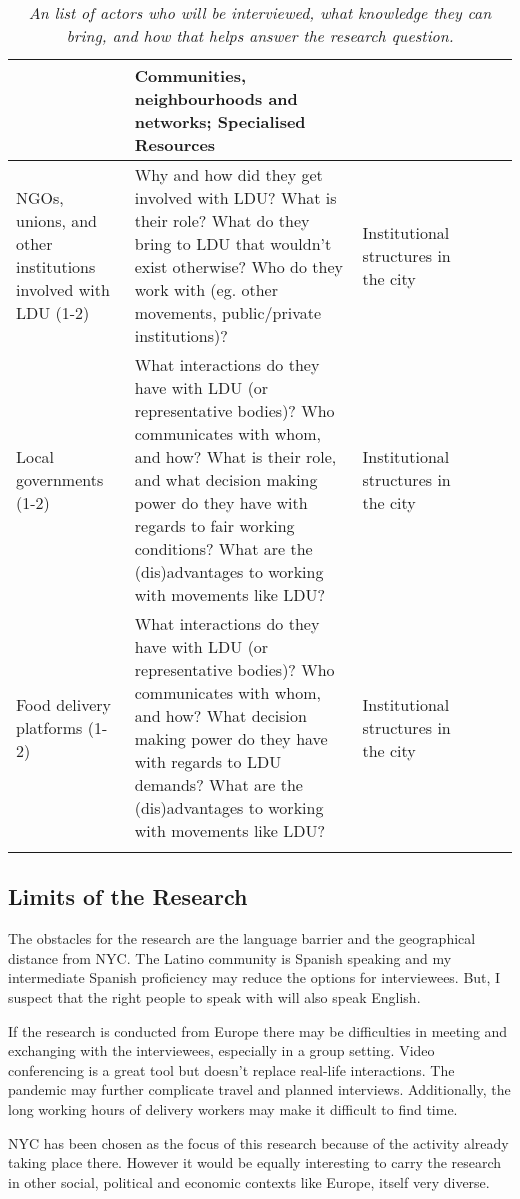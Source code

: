 \documentclass{article}[12pt]
\begin{document}
\begin{longtable}{ Lp{.35\textwidth} Lp{.60\textwidth} Lp{.4\textwidth}}
	 &
	Communities, neighbourhoods and networks; Specialised Resources  \\ 
	\hline
	NGOs, unions, and other institutions involved with LDU (1-2) &
	Why and how did they get involved with LDU? What is their role? What do they bring to LDU that wouldn't exist otherwise? Who do they work with (eg. other movements, public/private institutions)?
	&
	Institutional structures in the city  \\ 
	\hline
	Local governments (1-2) &
	What interactions do they have with LDU (or representative bodies)? Who communicates with whom, and how? What is their role, and what decision making power do they have with regards to fair working conditions? What are the (dis)advantages to working with movements like LDU? 
	&
	Institutional structures in the city  \\ 
	\hline
	Food delivery platforms (1-2) &
	What interactions do they have with LDU (or representative bodies)? Who communicates with whom, and how? What decision making power do they have with regards to LDU demands? What are the (dis)advantages to working with movements like LDU? 
	&
	Institutional structures in the city  \\ 
\bottomrule
\caption{\textit{An list of actors who will be interviewed, what knowledge they can bring, and how that helps answer the research question.}}
\label{interviews}
\end{longtable}

\subsection{Limits of the Research}

The obstacles for the research are the language barrier and the geographical distance from NYC. The Latino community is Spanish speaking and my intermediate Spanish proficiency may reduce the options for interviewees. But, I suspect that the right people to speak with will also speak English.

If the research is conducted from Europe there may be difficulties in meeting and exchanging with the interviewees, especially in a group setting. Video conferencing is a great tool but doesn't replace real-life interactions. The pandemic may further complicate travel and planned interviews. Additionally, the long working hours of delivery workers may make it difficult to find time.

NYC has been chosen as the focus of this research because of the activity already taking place there. However it would be equally interesting to carry the research in other social, political and economic contexts like Europe, itself very diverse.
\end{document}
